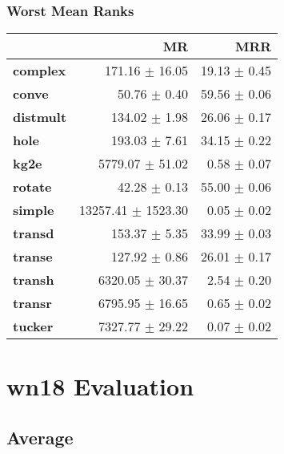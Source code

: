 \documentclass{article}
\begin{document}
    \subsubsection{Worst Mean Ranks}
    \begin{center}
    \begin{tabular}{lrr}
\toprule
{} &                  MR &           MRR \\
\midrule
\textbf{complex } &      171.16 $\pm$ 16.05 &  19.13 $\pm$ 0.45 \\
\textbf{conve   } &        50.76 $\pm$ 0.40 &  59.56 $\pm$ 0.06 \\
\textbf{distmult} &       134.02 $\pm$ 1.98 &  26.06 $\pm$ 0.17 \\
\textbf{hole    } &       193.03 $\pm$ 7.61 &  34.15 $\pm$ 0.22 \\
\textbf{kg2e    } &     5779.07 $\pm$ 51.02 &   0.58 $\pm$ 0.07 \\
\textbf{rotate  } &        42.28 $\pm$ 0.13 &  55.00 $\pm$ 0.06 \\
\textbf{simple  } &  13257.41 $\pm$ 1523.30 &   0.05 $\pm$ 0.02 \\
\textbf{transd  } &       153.37 $\pm$ 5.35 &  33.99 $\pm$ 0.03 \\
\textbf{transe  } &       127.92 $\pm$ 0.86 &  26.01 $\pm$ 0.17 \\
\textbf{transh  } &     6320.05 $\pm$ 30.37 &   2.54 $\pm$ 0.20 \\
\textbf{transr  } &     6795.95 $\pm$ 16.65 &   0.65 $\pm$ 0.02 \\
\textbf{tucker  } &     7327.77 $\pm$ 29.22 &   0.07 $\pm$ 0.02 \\
\bottomrule
\end{tabular}

    \end{center}

\section{wn18 Evaluation}
    \subsection{Average}
\end{document}
